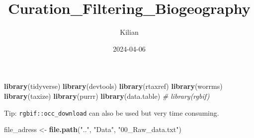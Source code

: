 \documentclass[
]{article}
\title{Curation\_Filtering\_Biogeography}
\author{Kilian}
\date{2024-04-06}
\newenvironment{Shaded}{\begin{snugshade}}{\end{snugshade}}
\newcommand{\CommentTok}[1]{\textcolor[rgb]{0.56,0.35,0.01}{\textit{#1}}}
\newcommand{\FunctionTok}[1]{\textcolor[rgb]{0.13,0.29,0.53}{\textbf{#1}}}
\newcommand{\NormalTok}[1]{#1}
\newcommand{\OtherTok}[1]{\textcolor[rgb]{0.56,0.35,0.01}{#1}}
\newcommand{\StringTok}[1]{\textcolor[rgb]{0.31,0.60,0.02}{#1}}
\begin{document}
\maketitle

\begin{Shaded}
\begin{Highlighting}[]
\FunctionTok{library}\NormalTok{(tidyverse)}
\FunctionTok{library}\NormalTok{(devtools)}
\FunctionTok{library}\NormalTok{(rtaxref)}
\FunctionTok{library}\NormalTok{(worrms)}
\FunctionTok{library}\NormalTok{(taxize)}
\FunctionTok{library}\NormalTok{(purrr)}
\FunctionTok{library}\NormalTok{(data.table)}
\CommentTok{\# library(rgbif)}
\end{Highlighting}
\end{Shaded}

Tip: \texttt{rgbif::occ\_download} can also be used but very time
consuming.

\begin{Shaded}
\begin{Highlighting}[]
\NormalTok{file\_adress }\OtherTok{\textless{}{-}} \FunctionTok{file.path}\NormalTok{(}\StringTok{".."}\NormalTok{, }\StringTok{"Data"}\NormalTok{, }\StringTok{"00\_Raw\_data.txt"}\NormalTok{)}
\end{Highlighting}
\end{Shaded}
\end{document}
